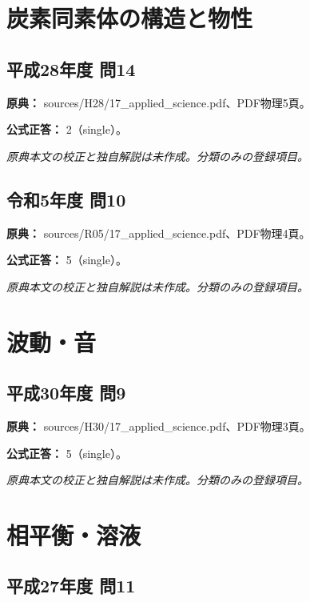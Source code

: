 \section{炭素同素体の構造と物性}

\subsection{平成28年度 問14}
\label{q:h28-reg-applied-14}

\noindent\textbf{原典：} sources/H28/17\_applied\_science.pdf、PDF物理5頁。

\textbf{公式正答：} 2（single）。

\par\textit{原典本文の校正と独自解説は未作成。分類のみの登録項目。}

\subsection{令和5年度 問10}
\label{q:r05-reg-applied-10}

\noindent\textbf{原典：} sources/R05/17\_applied\_science.pdf、PDF物理4頁。

\textbf{公式正答：} 5（single）。

\par\textit{原典本文の校正と独自解説は未作成。分類のみの登録項目。}

\section{波動・音}

\subsection{平成30年度 問9}
\label{q:h30-reg-applied-09}

\noindent\textbf{原典：} sources/H30/17\_applied\_science.pdf、PDF物理3頁。

\textbf{公式正答：} 5（single）。

\par\textit{原典本文の校正と独自解説は未作成。分類のみの登録項目。}

\section{相平衡・溶液}

\subsection{平成27年度 問11}
\label{q:h27-reg-applied-11}

